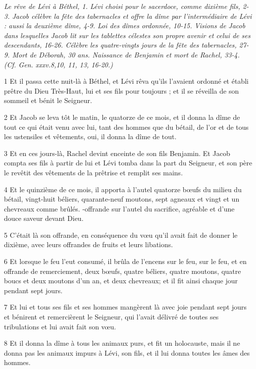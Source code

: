 
\par \textit{Le rêve de Lévi à Béthel, 1. Lévi choisi pour le sacerdoce, comme dixième fils, 2-3. Jacob célèbre la fête des tabernacles et offre la dîme par l'intermédiaire de Lévi : aussi la deuxième dîme, 4-9. Loi des dîmes ordonnée, 10-15. Visions de Jacob dans lesquelles Jacob lit sur les tablettes célestes son propre avenir et celui de ses descendants, 16-26. Célèbre les quatre-vingts jours de la fête des tabernacles, 27-9. Mort de Déborah, 30 ans. Naissance de Benjamin et mort de Rachel, 33-4. (Cf. Gen. xxxv.8,10, 11, 13, 16-20.)}

\par 1 Et il passa cette nuit-là à Béthel, et Lévi rêva qu'ils l'avaient ordonné et établi prêtre du Dieu Très-Haut, lui et ses fils pour toujours ; et il se réveilla de son sommeil et bénit le Seigneur.
\par 2 Et Jacob se leva tôt le matin, le quatorze de ce mois, et il donna la dîme de tout ce qui était venu avec lui, tant des hommes que du bétail, de l'or et de tous les ustensiles et vêtements, oui, il donna la dîme de tout.
\par 3 Et en ces jours-là, Rachel devint enceinte de son fils Benjamin. Et Jacob compta ses fils à partir de lui et Lévi tomba dans la part du Seigneur, et son père le revêtit des vêtements de la prêtrise et remplit ses mains.
\par 4 Et le quinzième de ce mois, il apporta à l'autel quatorze bœufs du milieu du bétail, vingt-huit béliers, quarante-neuf moutons, sept agneaux et vingt et un chevreaux comme brûlés. -offrande sur l'autel du sacrifice, agréable et d'une douce saveur devant Dieu.
\par 5 C'était là son offrande, en conséquence du vœu qu'il avait fait de donner le dixième, avec leurs offrandes de fruits et leurs libations.
\par 6 Et lorsque le feu l'eut consumé, il brûla de l'encens sur le feu, sur le feu, et en offrande de remerciement, deux bœufs, quatre béliers, quatre moutons, quatre boucs et deux moutons d'un an, et deux chevreaux; et il fit ainsi chaque jour pendant sept jours.
\par 7 Et lui et tous ses fils et ses hommes mangèrent là avec joie pendant sept jours et bénirent et remercièrent le Seigneur, qui l'avait délivré de toutes ses tribulations et lui avait fait son vœu.
\par 8 Et il donna la dîme à tous les animaux purs, et fit un holocauste, mais il ne donna pas les animaux impurs à Lévi, son fils, et il lui donna toutes les âmes des hommes.
